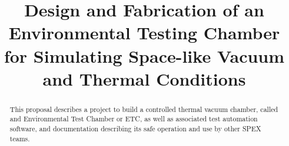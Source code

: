 \documentclass[conference]{IEEEtran} %
\title{Design and Fabrication of an Environmental Testing Chamber for Simulating Space-like Vacuum and Thermal Conditions}
\author{
  \IEEEauthorblockN{%
    T.J.~Tarazevits\IEEEauthorrefmark{1},
  }
  \IEEEauthorblockA{%
    RIT Space Exploration, Rochester Institute of Technology \\ %
    Rochester, N.Y. \\
    Email:
    \IEEEauthorrefmark{1}tjt3085@rit.edu,
  }

}
\begin{document}
\maketitle%

\begin{abstract}
  This proposal describes a project to build a controlled thermal vacuum chamber, called and Environmental Test Chamber or ETC, as well as associated test automation software, and documentation describing its safe operation and use by other SPEX teams.

\end{abstract}

\label{sec:nomenclature}
\newcommand{\nomunit}[1]{%
\renewcommand{\nomentryend}{\hspace*{\fill}#1}}
\renewcommand{\nompreamble}{

  }
\printnomenclature{}
\end{document}
